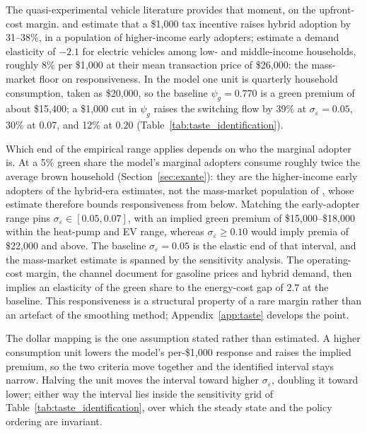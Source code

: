 The quasi-experimental vehicle literature provides that moment, on the
upfront-cost margin. \citet{GallagherMuehlegger2011} and \citet{Chandra2010} estimate that a
\$1{,}000 tax incentive raises hybrid adoption by 31--38\%, in a population of
higher-income early adopters; \citet{MuehleggerRapson2022} estimate a demand elasticity of
$-2.1$ for electric vehicles among low- and middle-income households, roughly 8\% per
\$1{,}000 at their mean transaction price of \$26{,}000: the mass-market floor on
responsiveness. In the model one unit is quarterly household consumption, taken as
\$20{,}000, so the baseline $\psi_g=0.770$ is a green premium of about \$15{,}400; a
\$1{,}000 cut in $\psi_g$ raises the switching flow by 39\% at
$\sigma_\varepsilon=0.05$, 30\% at $0.07$, and 12\% at $0.20$
(Table~\ref{tab:taste_identification}).

Which end of the empirical range applies depends on who the marginal adopter is.
At a 5\% green share the model's marginal adopters
consume roughly twice the average brown household (Section~\ref{sec:exante}): they
are the higher-income early adopters of the hybrid-era estimates, not the
mass-market population of \citet{MuehleggerRapson2022}, whose estimate therefore bounds
responsiveness from below. Matching the early-adopter range pins
$\sigma_\varepsilon\in[0.05,0.07]$, with an implied green premium of
\$15{,}000--\$18{,}000 within the heat-pump and EV range, whereas
$\sigma_\varepsilon\ge 0.10$ would imply premia of \$22{,}000 and above. The baseline
$\sigma_\varepsilon=0.05$ is the elastic end of that interval, and the mass-market
estimate is spanned by the sensitivity analysis. The operating-cost margin, the
channel \citet{BeresteanuLi2011} document for gasoline prices and hybrid demand, then
implies an elasticity of the green share to the energy-cost gap of $2.7$ at the
baseline. This responsiveness is a structural property of a rare margin rather than an
artefact of the smoothing method; Appendix~\ref{app:taste} develops the point.

The dollar mapping is the one assumption stated rather than estimated. A higher
consumption unit lowers the model's per-\$1{,}000 response and raises the implied
premium, so the two criteria move together and the identified interval stays
narrow. Halving the unit moves the interval toward higher $\sigma_\varepsilon$,
doubling it toward lower; either way the interval lies inside the sensitivity grid
of Table~\ref{tab:taste_identification}, over which the steady state and the policy
ordering are invariant.

